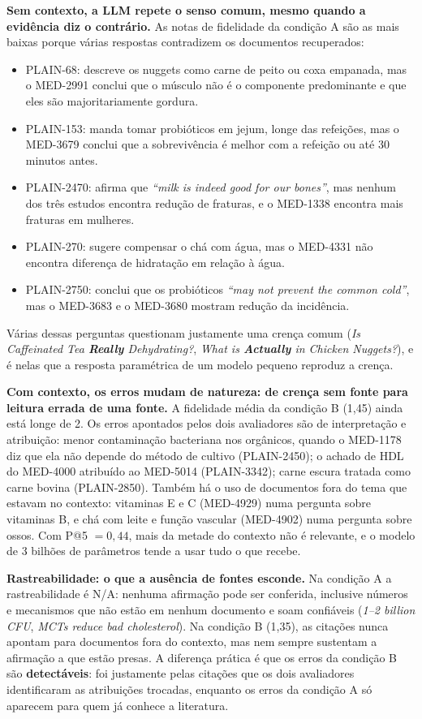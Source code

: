 \documentclass[10pt,a4paper]{article}
\newcommand{\med}[1]{\mbox{MED-#1}}         %
\newcommand{\pq}[1]{\mbox{PLAIN-#1}}        %
\begin{document}
\textbf{Sem contexto, a LLM repete o senso comum, mesmo quando a evidência diz o contrário.} As notas de fidelidade da condição A são as mais baixas porque várias respostas contradizem os documentos recuperados:
\begin{itemize}
\item \pq{68}: descreve os nuggets como carne de peito ou coxa empanada, mas o \med{2991} conclui que o músculo não é o componente predominante e que eles são majoritariamente gordura.
\item \pq{153}: manda tomar probióticos em jejum, longe das refeições, mas o \med{3679} conclui que a sobrevivência é melhor com a refeição ou até 30 minutos antes.
\item \pq{2470}: afirma que \emph{``milk is indeed good for our bones''}, mas nenhum dos três estudos encontra redução de fraturas, e o \med{1338} encontra mais fraturas em mulheres.
\item \pq{270}: sugere compensar o chá com água, mas o \med{4331} não encontra diferença de hidratação em relação à água.
\item \pq{2750}: conclui que os probióticos \emph{``may not prevent the common cold''}, mas o \med{3683} e o \med{3680} mostram redução da incidência.
\end{itemize}
Várias dessas perguntas questionam justamente uma crença comum (\emph{Is Caffeinated Tea \textbf{Really} Dehydrating?}, \emph{What is \textbf{Actually} in Chicken Nuggets?}), e é nelas que a resposta paramétrica de um modelo pequeno reproduz a crença.

\textbf{Com contexto, os erros mudam de natureza: de crença sem fonte para leitura errada de uma fonte.} A fidelidade média da condição B (1,45) ainda está longe de 2. Os erros apontados pelos dois avaliadores são de interpretação e atribuição: menor contaminação bacteriana nos orgânicos, quando o \med{1178} diz que ela não depende do método de cultivo (\pq{2450}); o achado de HDL do \med{4000} atribuído ao \med{5014} (\pq{3342}); carne escura tratada como carne bovina (\pq{2850}). Também há o uso de documentos fora do tema que estavam no contexto: vitaminas E e C (\med{4929}) numa pergunta sobre vitaminas B, e chá com leite e função vascular (\med{4902}) numa pergunta sobre ossos. Com P@5 $= 0{,}44$, mais da metade do contexto não é relevante, e o modelo de 3 bilhões de parâmetros tende a usar tudo o que recebe.

\textbf{Rastreabilidade: o que a ausência de fontes esconde.} Na condição A a rastreabilidade é N/A: nenhuma afirmação pode ser conferida, inclusive números e mecanismos que não estão em nenhum documento e soam confiáveis (\emph{1--2 billion CFU}, \emph{MCTs reduce bad cholesterol}). Na condição B (1,35), as citações nunca apontam para documentos fora do contexto, mas nem sempre sustentam a afirmação a que estão presas. A diferença prática é que os erros da condição B são \textbf{detectáveis}: foi justamente pelas citações que os dois avaliadores identificaram as atribuições trocadas, enquanto os erros da condição A só aparecem para quem já conhece a literatura.
\end{document}
